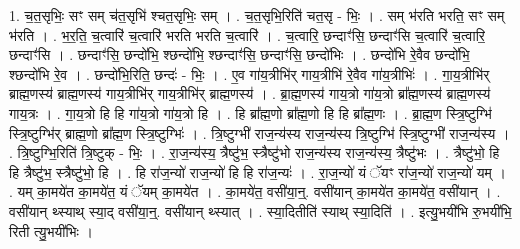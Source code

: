 \documentclass[17pt]{extarticle}
\begin{document}
1. च॒त॒सृभिः॒ सꣳ सम् च॑त॒सृभि॑ श्चत॒सृभिः॒ सम् । . च॒त॒सृभि॒रिति॑ चत॒सृ - भिः॒ । . सम् भ॑रति भरति॒ सꣳ सम् भ॑रति । . भ॒र॒ति॒ च॒त्वारि॑ च॒त्वारि॑ भरति भरति च॒त्वारि॑ । . च॒त्वारि॒ छन्दाꣳ॑सि॒ छन्दाꣳ॑सि च॒त्वारि॑ च॒त्वारि॒ छन्दाꣳ॑सि । . छन्दाꣳ॑सि॒ छन्दो॑भि॒ श्छन्दो॑भि॒ श्छन्दाꣳ॑सि॒ छन्दाꣳ॑सि॒ छन्दो॑भिः । . छन्दो॑भि रे॒वैव छन्दो॑भि॒ श्छन्दो॑भि रे॒व । . छन्दो॑भि॒रिति॒ छन्दः॑ - भिः॒ । . ए॒व गा॑य॒त्रीभि॑र् गाय॒त्रीभि॑ रे॒वैव गा॑य॒त्रीभिः॑ । . गा॒य॒त्रीभि॑र् ब्राह्म॒णस्य॑ ब्राह्म॒णस्य॑ गाय॒त्रीभि॑र् गाय॒त्रीभि॑र् ब्राह्म॒णस्य॑ । . ब्रा॒ह्म॒णस्य॑ गाय॒त्रो गा॑य॒त्रो ब्रा᳚ह्म॒णस्य॑ ब्राह्म॒णस्य॑ गाय॒त्रः । . गा॒य॒त्रो हि हि गा॑य॒त्रो गा॑य॒त्रो हि । . हि ब्रा᳚ह्म॒णो ब्रा᳚ह्म॒णो हि हि ब्रा᳚ह्म॒णः । . ब्रा॒ह्म॒ण स्त्रि॒ष्टुग्भि॑ स्त्रि॒ष्टुग्भि॑र् ब्राह्म॒णो ब्रा᳚ह्म॒ण स्त्रि॒ष्टुग्भिः॑ । . त्रि॒ष्टुग्भी॑ राज॒न्य॑स्य राज॒न्य॑स्य त्रि॒ष्टुग्भि॑ स्त्रि॒ष्टुग्भी॑ राज॒न्य॑स्य । . त्रि॒ष्टुग्भि॒रिति॑ त्रि॒ष्टुक् - भिः॒ । . रा॒ज॒न्य॑स्य॒ त्रैष्टु॑भ॒ स्त्रैष्टु॑भो राज॒न्य॑स्य राज॒न्य॑स्य॒ त्रैष्टु॑भः । . त्रैष्टु॑भो॒ हि हि त्रैष्टु॑भ॒ स्त्रैष्टु॑भो॒ हि । . हि रा॑ज॒न्यो॑ राज॒न्यो॑ हि हि रा॑ज॒न्यः॑ । . रा॒ज॒न्यो॑ यं ॅयꣳ रा॑ज॒न्यो॑ राज॒न्यो॑ यम् । . यम् का॒मये॑त का॒मये॑त॒ यं ॅयम् का॒मये॑त । . का॒मये॑त॒ वसी॑या॒न्॒. वसी॑यान् का॒मये॑त का॒मये॑त॒ वसी॑यान् । . वसी॑यान् थ्स्याथ् स्या॒द् वसी॑या॒न्॒. वसी॑यान् थ्स्यात् । . स्या॒दितीति॑ स्याथ् स्या॒दिति॑ । . इत्यु॒भयी॑भि रु॒भयी॑भि॒ रिती त्यु॒भयी॑भिः । \newline
\end{document}

